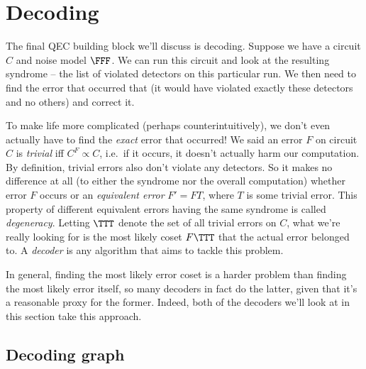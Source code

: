 \section{Decoding}\label{sec:decoding}

The final QEC building block we'll discuss is decoding.
Suppose we have a circuit $C$ and noise model $\FFF$.
We can run this circuit and look at the resulting syndrome -- the list of violated detectors on this particular run.
We then need to find the error that occurred that (it would have violated exactly these detectors and no others) and correct it.

To make life more complicated (perhaps counterintuitively), we don't even actually have to find the \textit{exact} error that occurred!
We said an error $F$ on circuit $C$ is \textit{trivial} iff $C^F \propto C$, i.e.\ if it occurs, it doesn't actually harm our computation.
By definition, trivial errors also don't violate any detectors.
So it makes no difference at all (to either the syndrome nor the overall computation) whether error $F$ occurs or an \textit{equivalent error} $F' = FT$, where $T$ is some trivial error.
This property of different equivalent errors having the same syndrome is called \textit{degeneracy}.
Letting $\TTT$ denote the set of all trivial errors on $C$, what we're really looking for is the most likely coset $F\TTT$ that the actual error belonged to.
A \textit{decoder} is any algorithm that aims to tackle this problem.

In general, finding the most likely error coset is a harder problem than finding the most likely error itself, so many decoders in fact do the latter, given that it's a reasonable proxy for the former.
Indeed, both of the decoders we'll look at in this section take this approach.

\subsection{Decoding graph}

